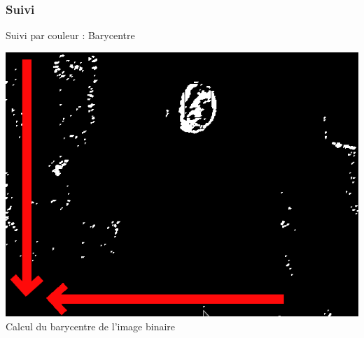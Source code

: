 \documentclass{beamer}
\begin{document}
            \subsubsection{Suivi}
            \begin{frame}{Suivi par couleur : Barycentre}
                  \begin{center}
                        \includegraphics[scale=0.25]{Capture4.png}\\
                        Calcul du barycentre de l'image binaire
                  \end{center}
            \end{frame}
\end{document}
